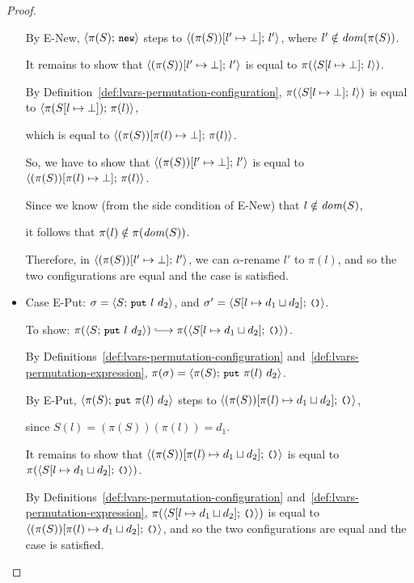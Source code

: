 \begin{proof}
\begin{itemize}
      By {\sc E-New}, $\langle \pi(S);\, \mbox{\small{\texttt{new}}} \rangle$ steps to
      $\langle (\pi(S))[l' \mapsto \bot];\, l' \rangle$, where $l' \notin
      \mathit{dom}(\pi(S))$.
      
      It remains to show that
      $\langle (\pi(S))[l' \mapsto \bot];\, l' \rangle$ is equal to
      $\pi(\langle S[l \mapsto \bot];\, l \rangle)$.

      By Definition~\ref{def:lvars-permutation-configuration},
      $\pi(\langle S[l \mapsto \bot];\, l \rangle)$ is equal to
      $\langle \pi(S[l \mapsto \bot]);\, \pi(l) \rangle$,

      which is equal to
      $\langle (\pi(S))[\pi(l) \mapsto \bot];\, \pi(l) \rangle$.

      So, we have to show that
      $\langle (\pi(S))[l' \mapsto \bot];\, l' \rangle$ is equal to
      $\langle (\pi(S))[\pi(l) \mapsto \bot];\, \pi(l) \rangle$.

      Since we know (from the side condition of {\sc E-New}) that $l
      \notin \mathit{dom}(S)$,

      it follows that $\pi(l) \notin \pi(\mathit{dom}(S))$.

      Therefore, in $\langle (\pi(S))[l' \mapsto \bot];\, l' \rangle$, we
      can $\alpha$-rename $l'$ to $\pi(l)$, and so the two
      configurations are equal and the case is satisfied.

    \item Case {\sc E-Put}: $\sigma = \langle S;\, \mbox{\small{\texttt{put}}}~l~d_2 \rangle$, and
      $\sigma' = \langle S[l \mapsto d_1 \sqcup d_2];\, \mbox{\small{\texttt{()}}} \rangle$.

      To show: $\pi(\config{S}{\putexp{l}{d_2}}) \parstepsto
      \pi(\config{\extSRaw{S}{l}{\userlub{d_1}{d_2}}}{\unit})$.

      By Definitions~\ref{def:lvars-permutation-configuration}
      and~\ref{def:lvars-permutation-expression}, $\pi(\sigma) =
      \langle \pi(S);\, \mbox{\small{\texttt{put}}}~\pi(l)~d_2 \rangle$.

      By {\sc E-Put}, $\langle \pi(S);\, \mbox{\small{\texttt{put}}}~\pi(l)~d_2 \rangle$ steps to
      $\langle (\pi(S))[\pi(l) \mapsto d_1 \sqcup d_2];\, \mbox{\small{\texttt{()}}} \rangle$,

      since $S(l) = (\pi(S))(\pi(l)) = d_1$.

      It remains to show that
      $\langle (\pi(S))[\pi(l) \mapsto d_1 \sqcup d_2];\, \mbox{\small{\texttt{()}}} \rangle$
      is equal to
      $\pi(\langle S[l \mapsto d_1 \sqcup d_2];\, \mbox{\small{\texttt{()}}} \rangle)$.

      By Definitions~\ref{def:lvars-permutation-configuration}
      and~\ref{def:lvars-permutation-expression},
      $\pi(\langle S[l \mapsto d_1 \sqcup d_2];\, \mbox{\small{\texttt{()}}} \rangle)$ is
      equal to
      $\langle (\pi(S))[\pi(l) \mapsto d_1 \sqcup d_2];\, \mbox{\small{\texttt{()}}} \rangle$,
      and so the two configurations are equal and the case is
      satisfied.


\end{itemize}
\end{proof}
